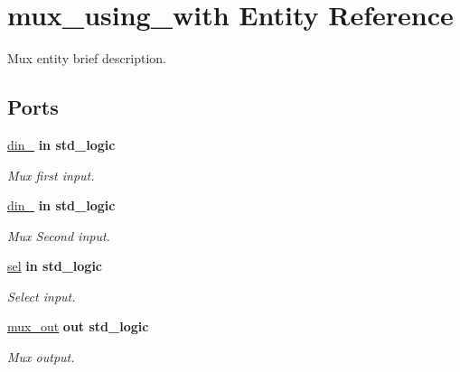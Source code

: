 \hypertarget{classmux__using__with}{\section{mux\-\_\-using\-\_\-with Entity Reference}
\label{classmux__using__with}
}


Mux entity brief description.  


\subsection*{Ports}
 \begin{DoxyCompactItemize}
\item 
\hyperlink{classmux__using__with_af60b470af850edfe2a766ef15ffcc7c1}{din\-\_}  {\bfseries {\bfseries \textcolor{vhdlkeyword}{in}\textcolor{vhdlchar}{ }}} {\bfseries \textcolor{comment}{std\-\_\-logic}\textcolor{vhdlchar}{ }} 
\begin{DoxyCompactList}\small\item\em Mux first input. \end{DoxyCompactList}\item 
\hypertarget{classmux__using__with_a45a6e584caaf4eb967f79e90560e13a5}{\hyperlink{classmux__using__with_a45a6e584caaf4eb967f79e90560e13a5}{din\-\_}  {\bfseries {\bfseries \textcolor{vhdlkeyword}{in}\textcolor{vhdlchar}{ }}} {\bfseries \textcolor{comment}{std\-\_\-logic}\textcolor{vhdlchar}{ }} }\label{classmux__using__with_a45a6e584caaf4eb967f79e90560e13a5}

\begin{DoxyCompactList}\small\item\em Mux Second input. \end{DoxyCompactList}\item 
\hypertarget{classmux__using__with_afdf90ff4b63a502f4a623b0afbda6d80}{\hyperlink{classmux__using__with_afdf90ff4b63a502f4a623b0afbda6d80}{sel}  {\bfseries {\bfseries \textcolor{vhdlkeyword}{in}\textcolor{vhdlchar}{ }}} {\bfseries \textcolor{comment}{std\-\_\-logic}\textcolor{vhdlchar}{ }} }\label{classmux__using__with_afdf90ff4b63a502f4a623b0afbda6d80}

\begin{DoxyCompactList}\small\item\em Select input. \end{DoxyCompactList}\item 
\hypertarget{classmux__using__with_a22f89b66523a35bf7f80cac1d166fe0f}{\hyperlink{classmux__using__with_a22f89b66523a35bf7f80cac1d166fe0f}{mux\-\_\-out}  {\bfseries {\bfseries \textcolor{vhdlkeyword}{out}\textcolor{vhdlchar}{ }}} {\bfseries \textcolor{comment}{std\-\_\-logic}\textcolor{vhdlchar}{ }} }\label{classmux__using__with_a22f89b66523a35bf7f80cac1d166fe0f}

\begin{DoxyCompactList}\small\item\em Mux output. \end{DoxyCompactList}\end{DoxyCompactItemize}


